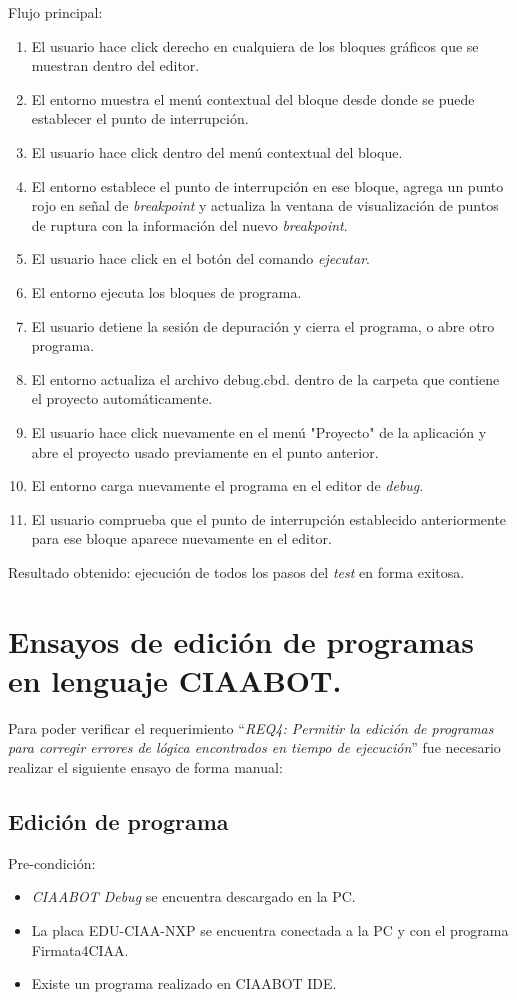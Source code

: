 Flujo principal:
\begin{enumerate}
    \item
	El usuario hace click derecho en cualquiera de los bloques gráficos que se muestran dentro del editor.
	\item
	El entorno muestra el menú contextual del bloque desde donde se puede establecer el punto de interrupción.
	\item
	El usuario hace click dentro del menú contextual del bloque.
	\item
	El entorno establece el punto de interrupción en ese bloque, agrega un punto rojo en señal de \emph{breakpoint} y actualiza la ventana de visualización de puntos de ruptura con la información del nuevo \emph{breakpoint}.
	\item
	El usuario hace click en el botón del comando \emph{ejecutar}.
	\item
	El entorno ejecuta los bloques de programa.
	\item
    El usuario detiene la sesión de depuración y cierra el programa, o abre otro programa.
	\item
	El entorno actualiza el archivo debug.cbd. dentro de la carpeta que contiene el proyecto automáticamente.
	\item
	El usuario hace click nuevamente en el menú "Proyecto" de la aplicación y abre el proyecto usado previamente  en el punto anterior.
	\item
	El entorno carga nuevamente el programa en el editor de \emph{debug}.
	\item
	El usuario comprueba que el punto de interrupción establecido anteriormente para ese bloque aparece nuevamente en el editor.
	
\end{enumerate}

Resultado obtenido: ejecución de todos los pasos del \emph{test} en forma exitosa. 


\section{Ensayos de edición de programas en lenguaje CIAABOT.}
\label{sec:Ensayos de edición de programas en lenguaje CIAABOT.}

Para poder verificar el requerimiento “\emph{REQ4: Permitir la edición de programas para corregir errores de lógica encontrados en tiempo de ejecución}”
fue necesario realizar el siguiente ensayo de forma manual:

\subsection{Edición de programa}
Pre-condición:
\begin{itemize}
	\item \emph{CIAABOT Debug} se encuentra descargado en la PC.
	\item La placa EDU-CIAA-NXP se encuentra conectada a la PC y con el programa Firmata4CIAA.
	\item Existe un programa realizado en CIAABOT IDE.
\end{itemize}

